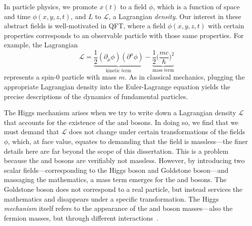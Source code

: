 In particle physics, we promote $x(t)$ to a field\footnotemark{} $\phi$, which is a function of space and time $\phi(x, y, z, t)$, and $L$ to $\mathcal{L}$, a Lagrangian \textit{density}.
Our interest in these abstract fields is well-motivated in QFT, where a field $\phi(x,y,z,t)$ with certain properties corresponds to an observable particle with those same properties. 
For example, the Lagrangian 
\begin{equation}
    \mathcal{L} = \underbrace{\frac{1}{2}(\partial_\mu\phi)(\partial^\mu\phi)}_{\text{kinetic term}} - \underbrace{\frac{1}{2}\big(\frac{mc}{\hbar}\big)^2}_\text{mass term}
\end{equation}
represents a spin-0 particle with mass $m$. 
As in classical mechanics, plugging the appropriate Lagrangian density into the Euler-Lagrange equation yields the precise descriptions of the dynamics of fundamental particles. 

The Higgs mechanism arises when we try to write down a Lagrangian density $\mathcal{L}$ that accounts for the existence of the \PW and \PZ bosons. 
In doing so, we find that we must demand that $\mathcal{L}$ does not change under certain transformations of the fields $\phi$, which, at face value, equates to demanding that the field is massless---the finer details here are far beyond the scope of this dissertation. 
This is a problem because the \PW and \PZ bosons are verifiably not massless. 
However, by introducing two scalar fields---corresponding to the Higgs boson and Goldstone boson---and massaging the mathematics, a mass term emerges for the \PW and \PZ bosons. 
The Goldstone boson does not correspond to a real particle, but instead services the mathematics\footnotemark{} and disappears under a specific transformation. 
The Higgs \textit{mechanism} itself refers to the appearance of the \PW and \PZ boson masses---also the fermion masses, but through different interactions~\cite{Weinberg:1967tq, Nambu:1961fr}. 

